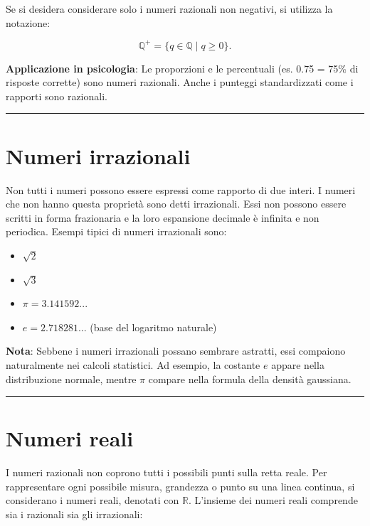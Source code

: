 \documentclass[
  italian,
  letterpaper,
  a4paper,
  11pt,
  open=any]{scrbook}
\providecommand{\tightlist}{%
  \setlength{\itemsep}{0pt}\setlength{\parskip}{0pt}}
\theoremstyle{plain}
\theoremstyle{definition}
\theoremstyle{definition}
\theoremstyle{remark}
\begin{document}
Se si desidera considerare solo i numeri razionali non negativi, si
utilizza la notazione:

\[
\mathbb{Q}^+ = \{q \in \mathbb{Q} \mid q \geq 0\}.
\]

\textbf{Applicazione in psicologia}: Le proporzioni e le percentuali
(es. 0.75 = 75\% di risposte corrette) sono numeri razionali. Anche i
punteggi standardizzati come i rapporti sono razionali.

\begin{center}\rule{0.5\linewidth}{0.5pt}\end{center}

\section{Numeri irrazionali}\label{numeri-irrazionali}

Non tutti i numeri possono essere espressi come rapporto di due interi.
I numeri che non hanno questa proprietà sono detti irrazionali. Essi non
possono essere scritti in forma frazionaria e la loro espansione
decimale è infinita e non periodica. Esempi tipici di numeri irrazionali
sono:

\begin{itemize}
\tightlist
\item
  \(\sqrt{2}\)
\item
  \(\sqrt{3}\)
\item
  \(\pi = 3.141592...\)
\item
  \(e = 2.718281...\) (base del logaritmo naturale)
\end{itemize}

\textbf{Nota}: Sebbene i numeri irrazionali possano sembrare astratti,
essi compaiono naturalmente nei calcoli statistici. Ad esempio, la
costante \(e\) appare nella distribuzione normale, mentre \(\pi\)
compare nella formula della densità gaussiana.

\begin{center}\rule{0.5\linewidth}{0.5pt}\end{center}

\section{Numeri reali}\label{numeri-reali}

I numeri razionali non coprono tutti i possibili punti sulla retta
reale. Per rappresentare ogni possibile misura, grandezza o punto su una
linea continua, si considerano i numeri reali, denotati con
\(\mathbb{R}\). L'insieme dei numeri reali comprende sia i razionali sia
gli irrazionali:
\end{document}

